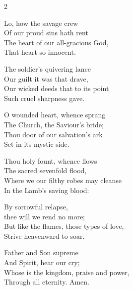 \begin{multicols}{2}
\raggedcolumns
\begin{enpars}
Lo, how the savage crew\\
Of our proud sins hath rent\\
The heart of our all-gracious God,\\
That heart so innocent.

The soldier's quivering lance\\
Our guilt it was that drave,\\
Our wicked deeds that to its point\\
Such cruel sharpness gave.

O wounded heart, whence sprang\\
The Church, the Saviour's bride;\\
Thou door of our salvation's ark\\
Set in its mystic side.

Thou holy fount, whence flows\\
The sacred sevenfold flood,\\
Where we our filthy robes may cleanse\\
In the Lamb's saving blood:

By sorrowful relapse,\\
thee will we rend no more;\\
But like the flames, those types of love,\\
Strive heavenward to soar.

Father and Son supreme\\
And Spirit, hear our cry;\\
Whose is the kingdom, praise and power,\\
Through all eternity.
Amen.

\end{enpars}
\end{multicols}
